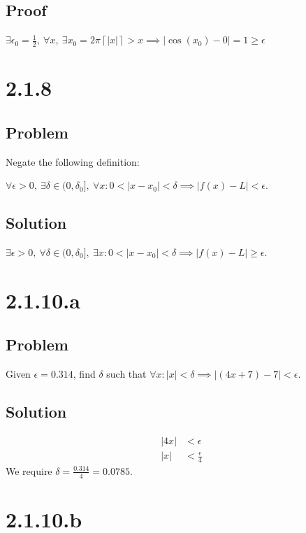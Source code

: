 \documentclass[12pt]{article}
\newcommand{\abs}  [1]{\left|       #1 \right|      }
\newcommand{\ceil} [1]{\left\lceil  #1 \right\rceil }
\begin{document}
\subsection*{Proof}
$\exists \epsilon_0 = \frac{1}{2},\ \forall x,\ \exists x_0 = 2 \pi \ceil{\abs{x}} > x \implies \abs{\cos(x_0) - 0} = 1 \geq \epsilon$



\section*{2.1.8}

\subsection*{Problem}
Negate the following definition:

$\forall \epsilon > 0,\ \exists \delta \in (0, \delta_0],\ \forall x : 0 < \abs{x - x_0} < \delta \implies \abs{f(x) - L} < \epsilon$.

\subsection*{Solution}
$\exists \epsilon > 0,\ \forall \delta \in (0, \delta_0],\ \exists x : 0 < \abs{x - x_0} < \delta \implies \abs{f(x) - L} \geq \epsilon$.



\section*{2.1.10.a}

\subsection*{Problem}
Given $\epsilon = 0.314$, find $\delta$ such that $\forall x : \abs{x} < \delta \implies \abs{(4x + 7) - 7} < \epsilon$.

\subsection*{Solution}
\begin{align*}
    \abs{4x} &< \epsilon \\
    \abs{x} &< \frac{\epsilon}{4}
\end{align*}
We require $\delta = \frac{0.314}{4} = \boxed{0.0785}$.



\section*{2.1.10.b}
\end{document}
